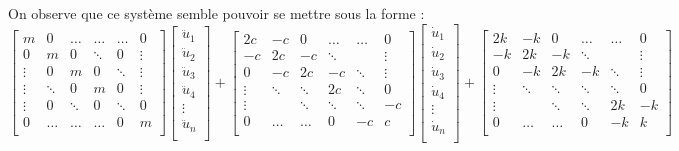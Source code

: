 \documentclass[10pt,fleqn]{article} %
\begin{document}
On observe que ce système semble pouvoir se mettre sous la forme :
$$
\begin{bmatrix}
m & 0 & \ldots & \ldots & \ldots & 0\\
0  & m & 0 & \ddots & 0 & \vdots\\
\vdots  & 0 & m & 0 & \ddots & \vdots\\
\vdots  & \ddots & 0 & m & 0 & \vdots\\
\vdots  & 0 & \ddots & 0 & \ddots & 0\\
0  & \ldots & \ldots & \ldots & 0 & m\\
\end{bmatrix}
\begin{bmatrix}
\ddot{u}_1\\
\ddot{u}_2\\
\ddot{u}_3\\
\ddot{u}_4\\
\vdots\\
\ddot{u}_n\\
\end{bmatrix}
+
\begin{bmatrix}
2c & -c & 0 & \ldots & \ldots & 0\\
-c  & 2c & -c & \ddots &  & \vdots\\
0  & -c & 2c & -c & \ddots & \vdots\\
\vdots  & \ddots & \ddots & 2c &\ddots & 0\\
\vdots  &  & \ddots &\ddots & \ddots & -c\\
0  & \ldots & \ldots & 0 & -c & c\\
\end{bmatrix}
\begin{bmatrix}
\dot{u}_1\\
\dot{u}_2\\
\dot{u}_3\\
\dot{u}_4\\
\vdots\\
\dot{u}_n\\
\end{bmatrix}
+
\begin{bmatrix}
2k & -k & 0 & \ldots & \ldots & 0\\
-k  & 2k & -k & \ddots &  & \vdots\\
0  & -k & 2k & -k & \ddots & \vdots\\
\vdots  & \ddots & \ddots &  \ddots&\ddots & 0\\
\vdots  &  & \ddots &\ddots & 2k & -k\\
0  & \ldots & \ldots & 0 & -k & k\\

\end{bmatrix}$$
\end{document}
